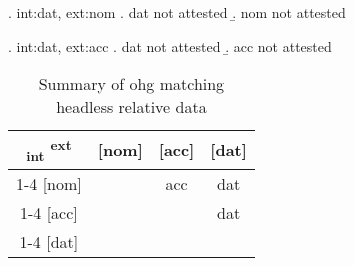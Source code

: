  \ex. \ac{int}:\ac{dat}, \ac{ext}:\ac{nom}
 \a. \ac{dat} not attested
 \b. \ac{nom} not attested

 \ex. \ac{int}:\ac{dat}, \ac{ext}:\ac{acc}
 \a. \ac{dat} not attested
 \b. \ac{acc} not attested




 \begin{table}[H]
   \center
   \caption {Summary of \ac{ohg} matching headless relative data}
 		\begin{tabular}{c|c|c|c}
 		  \toprule
 			\textsubscript{\ac{int}} \textsuperscript{\ac{ext}}
 		        & [\ac{nom}]
 		        & [\ac{acc}]
 		        & [\ac{dat}]
 		        \\ \cmidrule{1-4}
 		    [\ac{nom}]
 		        &
 		        & \ac{acc}
 		        & \ac{dat}
 		        \\ \cmidrule{1-4}
 		    [\ac{acc}]
 		        &
 		        &
 		        & \ac{dat}
 		        \\ \cmidrule{1-4}
 		    [\ac{dat}]
 		        &
 		        &
 		        &
 		        \\
 		  \bottomrule
 		\end{tabular}
 \end{table}
